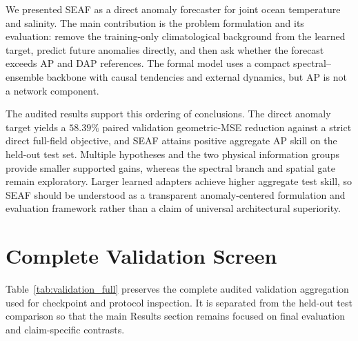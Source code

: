 \documentclass[conference]{IEEEtran}
\begin{document}
We presented SEAF as a direct anomaly forecaster for joint ocean temperature and salinity. The main contribution is the problem formulation and its evaluation: remove the training-only climatological background from the learned target, predict future anomalies directly, and then ask whether the forecast exceeds AP and DAP references. The formal model uses a compact spectral--ensemble backbone with causal tendencies and external dynamics, but AP is not a network component.

The audited results support this ordering of conclusions. The direct anomaly target yields a $58.39\%$ paired validation geometric-MSE reduction against a strict direct full-field objective, and SEAF attains positive aggregate AP skill on the held-out test set. Multiple hypotheses and the two physical information groups provide smaller supported gains, whereas the spectral branch and spatial gate remain exploratory. Larger learned adapters achieve higher aggregate test skill, so SEAF should be understood as a transparent anomaly-centered formulation and evaluation framework rather than a claim of universal architectural superiority.

\appendices
\section{Complete Validation Screen}
Table~\ref{tab:validation_full} preserves the complete audited validation aggregation used for checkpoint and protocol inspection. It is separated from the held-out test comparison so that the main Results section remains focused on final evaluation and claim-specific contrasts.
\end{document}
